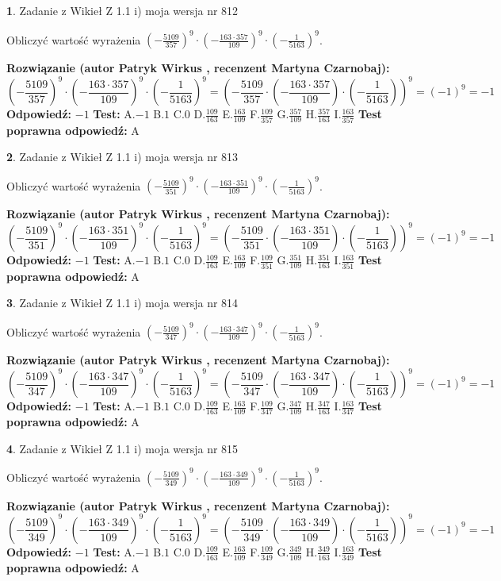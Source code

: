 \documentclass[12pt, a4paper]{article}
\theoremstyle{definition} %
\newtheorem{zad}{}
\newcommand{\zadStart}[1]{\begin{zad}#1\newline}
\newcommand{\zadStop}{\end{zad}}
\newcommand{\rozwStart}[2]{\noindent \textbf{Rozwiązanie (autor #1 , recenzent #2): }\newline}
\newcommand{\rozwStop}{\newline}
\newcommand{\odpStart}{\noindent \textbf{Odpowiedź:}\newline}
\newcommand{\odpStop}{\newline}
\newcommand{\testStart}{\noindent \textbf{Test:}\newline}
\newcommand{\testStop}{\newline}
\newcommand{\kluczStart}{\noindent \textbf{Test poprawna odpowiedź:}\newline}
\newcommand{\kluczStop}{\newline}
\begin{document}
\zadStart{Zadanie z Wikieł Z 1.1 i) moja wersja nr 812}

Obliczyć wartość wyrażenia $(-\frac{5109}{357})^{9} \cdot (-\frac{163 \cdot 357}{109})^{9} \cdot (-\frac{1}{5163})^{9}$.
\zadStop
\rozwStart{Patryk Wirkus}{Martyna Czarnobaj}
$$(-\frac{5109}{357})^{9} \cdot (-\frac{163 \cdot 357}{109})^{9} \cdot (-\frac{1}{5163})^{9} = (-\frac{5109}{357} \cdot (-\frac{163 \cdot 357}{109}) \cdot (-\frac{1}{5163}))^{9} = (-1)^{9} = -1$$
\rozwStop
\odpStart
$-1$
\odpStop
\testStart
A.$-1$ B.$1$ C.$0$ D.$\frac{109}{163}$ E.$\frac{163}{109}$
F.$\frac{109}{357}$ G.$\frac{357}{109}$
H.$\frac{357}{163}$
I.$\frac{163}{357}$
\testStop
\kluczStart
A
\kluczStop



\zadStart{Zadanie z Wikieł Z 1.1 i) moja wersja nr 813}

Obliczyć wartość wyrażenia $(-\frac{5109}{351})^{9} \cdot (-\frac{163 \cdot 351}{109})^{9} \cdot (-\frac{1}{5163})^{9}$.
\zadStop
\rozwStart{Patryk Wirkus}{Martyna Czarnobaj}
$$(-\frac{5109}{351})^{9} \cdot (-\frac{163 \cdot 351}{109})^{9} \cdot (-\frac{1}{5163})^{9} = (-\frac{5109}{351} \cdot (-\frac{163 \cdot 351}{109}) \cdot (-\frac{1}{5163}))^{9} = (-1)^{9} = -1$$
\rozwStop
\odpStart
$-1$
\odpStop
\testStart
A.$-1$ B.$1$ C.$0$ D.$\frac{109}{163}$ E.$\frac{163}{109}$
F.$\frac{109}{351}$ G.$\frac{351}{109}$
H.$\frac{351}{163}$
I.$\frac{163}{351}$
\testStop
\kluczStart
A
\kluczStop



\zadStart{Zadanie z Wikieł Z 1.1 i) moja wersja nr 814}

Obliczyć wartość wyrażenia $(-\frac{5109}{347})^{9} \cdot (-\frac{163 \cdot 347}{109})^{9} \cdot (-\frac{1}{5163})^{9}$.
\zadStop
\rozwStart{Patryk Wirkus}{Martyna Czarnobaj}
$$(-\frac{5109}{347})^{9} \cdot (-\frac{163 \cdot 347}{109})^{9} \cdot (-\frac{1}{5163})^{9} = (-\frac{5109}{347} \cdot (-\frac{163 \cdot 347}{109}) \cdot (-\frac{1}{5163}))^{9} = (-1)^{9} = -1$$
\rozwStop
\odpStart
$-1$
\odpStop
\testStart
A.$-1$ B.$1$ C.$0$ D.$\frac{109}{163}$ E.$\frac{163}{109}$
F.$\frac{109}{347}$ G.$\frac{347}{109}$
H.$\frac{347}{163}$
I.$\frac{163}{347}$
\testStop
\kluczStart
A
\kluczStop



\zadStart{Zadanie z Wikieł Z 1.1 i) moja wersja nr 815}

Obliczyć wartość wyrażenia $(-\frac{5109}{349})^{9} \cdot (-\frac{163 \cdot 349}{109})^{9} \cdot (-\frac{1}{5163})^{9}$.
\zadStop
\rozwStart{Patryk Wirkus}{Martyna Czarnobaj}
$$(-\frac{5109}{349})^{9} \cdot (-\frac{163 \cdot 349}{109})^{9} \cdot (-\frac{1}{5163})^{9} = (-\frac{5109}{349} \cdot (-\frac{163 \cdot 349}{109}) \cdot (-\frac{1}{5163}))^{9} = (-1)^{9} = -1$$
\rozwStop
\odpStart
$-1$
\odpStop
\testStart
A.$-1$ B.$1$ C.$0$ D.$\frac{109}{163}$ E.$\frac{163}{109}$
F.$\frac{109}{349}$ G.$\frac{349}{109}$
H.$\frac{349}{163}$
I.$\frac{163}{349}$
\testStop
\kluczStart
A
\kluczStop
\end{document}
